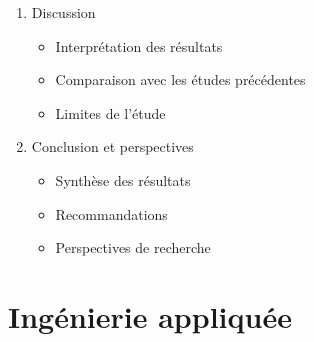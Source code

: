 \begin{enumerate}
    \item Discussion
          \begin{itemize}
              \item Interprétation des résultats
              \item Comparaison avec les études précédentes
              \item Limites de l'étude
          \end{itemize}

    \item Conclusion et perspectives
          \begin{itemize}
              \item Synthèse des résultats
              \item Recommandations
              \item Perspectives de recherche
          \end{itemize}

\end{enumerate}

\section{Ingénierie appliquée}

